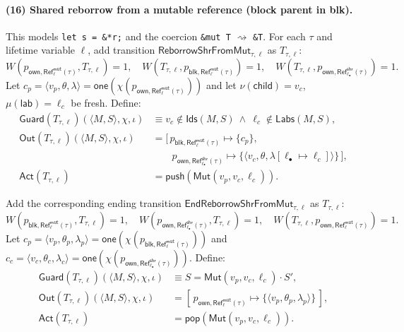 \documentclass[runningheads]{llncs}
\begin{document}
\paragraph{(16) Shared reborrow from a mutable reference (block parent in blk).}
This models \texttt{let s = \&*r;} and the coercion \texttt{\&mut T} $\rightsquigarrow$ \texttt{\&T}.
For each $\tau$ and lifetime variable $\ell$, add transition $\mathsf{ReborrowShrFromMut}_{\tau,\ell}$ as $T_{\tau,\ell}$:
\begin{equation*}
  W(p_{\mathsf{own},\mathsf{Ref}^{\mathsf{mut}}_{\ell}(\tau)},T_{\tau,\ell})=1,\quad
  W(T_{\tau,\ell},p_{\mathsf{blk},\mathsf{Ref}^{\mathsf{mut}}_{\ell}(\tau)})=1,\quad
  W(T_{\tau,\ell},p_{\mathsf{own},\mathsf{Ref}^{\mathsf{shr}}_{\ell_{\bullet}}(\tau)})=1.
\end{equation*}
Let $c_p=\langle v_p,\theta,\lambda\rangle=\mathsf{one}(\chi(p_{\mathsf{own},\mathsf{Ref}^{\mathsf{mut}}_{\ell}(\tau)}))$
and let $\nu(\mathsf{child})=v_c$, $\mu(\mathsf{lab})=\ell_c$ be fresh. Define:
\begin{align*}
\mathsf{Guard}(T_{\tau,\ell})(\langle M,S\rangle,\chi,\iota)
&\equiv v_c\notin \mathsf{Ids}(M,S)\ \wedge\ \ell_c\notin \mathsf{Labs}(M,S),\\
\mathsf{Out}(T_{\tau,\ell})(\langle M,S\rangle,\chi,\iota)
&= [\,p_{\mathsf{blk},\mathsf{Ref}^{\mathsf{mut}}_{\ell}(\tau)}\mapsto \{c_p\},\\
&\qquad p_{\mathsf{own},\mathsf{Ref}^{\mathsf{shr}}_{\ell_{\bullet}}(\tau)}\mapsto
      \{\langle v_c,\theta,\lambda[\ell_{\bullet}\mapsto \ell_c]\rangle\}\,],\\
\mathsf{Act}(T_{\tau,\ell})
&= \mathsf{push}(\mathsf{Mut}(v_p,v_c,\ell_c)).
\end{align*}

Add the corresponding ending transition $\mathsf{EndReborrowShrFromMut}_{\tau,\ell}$ as $T_{\tau,\ell}$:
\begin{equation*}
  W(p_{\mathsf{blk},\mathsf{Ref}^{\mathsf{mut}}_{\ell}(\tau)},T_{\tau,\ell})=1,\quad
  W(p_{\mathsf{own},\mathsf{Ref}^{\mathsf{shr}}_{\ell_{\bullet}}(\tau)},T_{\tau,\ell})=1,\quad
  W(T_{\tau,\ell},p_{\mathsf{own},\mathsf{Ref}^{\mathsf{mut}}_{\ell}(\tau)})=1.
\end{equation*}
Let $c_p=\langle v_p,\theta_p,\lambda_p\rangle=\mathsf{one}(\chi(p_{\mathsf{blk},\mathsf{Ref}^{\mathsf{mut}}_{\ell}(\tau)}))$ and
$c_c=\langle v_c,\theta_c,\lambda_c\rangle=\mathsf{one}(\chi(p_{\mathsf{own},\mathsf{Ref}^{\mathsf{shr}}_{\ell_{\bullet}}(\tau)}))$.
Define:
\begin{align*}
\mathsf{Guard}(T_{\tau,\ell})(\langle M,S\rangle,\chi,\iota)
&\equiv S=\mathsf{Mut}(v_p,v_c,\ell_c)\cdot S',\\
\mathsf{Out}(T_{\tau,\ell})(\langle M,S\rangle,\chi,\iota)
&= [\,p_{\mathsf{own},\mathsf{Ref}^{\mathsf{mut}}_{\ell}(\tau)}\mapsto \{\langle v_p,\theta_p,\lambda_p\rangle\}\,],\\
\mathsf{Act}(T_{\tau,\ell})
&= \mathsf{pop}(\mathsf{Mut}(v_p,v_c,\ell_c)).
\end{align*}
\end{document}
